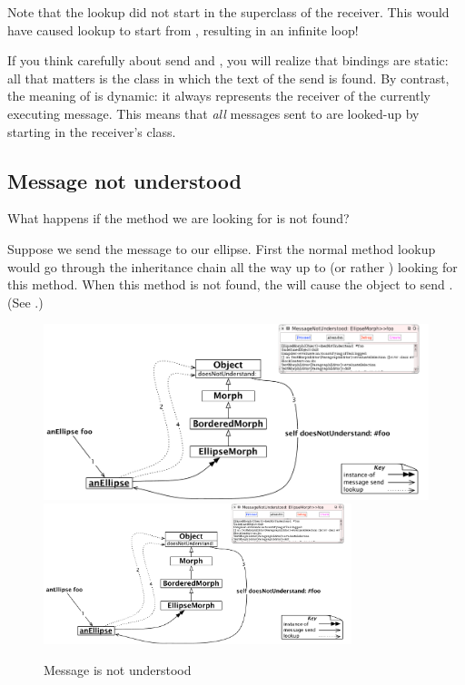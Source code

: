 \documentclass[a4paper,10pt,twoside]{book}
\begin{document}
Note that the \super lookup did not start in the superclass of the receiver.
This would have caused lookup to start from , resulting in an infinite loop!


If you think carefully about \super send and , you will realize that \super bindings are static: all that matters is the class in which the text of the \super send is found.
By contrast, the meaning of \self is dynamic: it always represents the receiver of the currently executing message. This means that  \emph{all}  messages sent to \self are looked-up by starting in the receiver's class.

\subsection{Message not understood}

What happens if the method we are looking for is not found?

Suppose we send the message  to our ellipse.
First the normal method lookup would go through the inheritance chain all the way up to  (or rather ) looking for this method.
When this method is not found, the  will cause the object to send .
(See .)

\begin{figure}[htb]
\begin{center}
\ifluluelse
	{\includegraphics[width=\textwidth]{fooNotFound}}
	{\includegraphics[width=0.8\textwidth]{fooNotFound}}
\caption{Message  is not understood\label{fig:fooNotFound}}
\end{center}
\end{figure}
\end{document}
